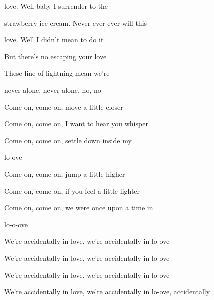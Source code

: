 \begin{song}
\bigskip

love. Well baby I surrender to the \par
{}strawberry ice cream. Never ever ever will this \par
{}love. Well I didn't mean to do it \par
But there's no escaping your love \par

\bigskip

 These line of lightning mean we're \par
{}never alone, never alone, no, no \par

\bigskip

Come on, come on, move a little closer \par
{}Come on, come on, I want to hear you whisper \par
{}Come on, come on, settle down inside my \par
{}lo-ove \par

\bigskip

Come on, come on, jump a little higher \par
{}Come on, come on, if you feel a little lighter \par
{}Come on, come on, we were once upon a time in \par
{}lo-o-ove \par

\bigskip

We're accidentally in love,  we're accidentally in lo-ove \par
We're accidentally in love,  we're accidentally in lo-ove \par
We're accidentally in love,  we're accidentally in lo-ove \par
We're accidentally in love,  we're accidentally in lo-ove, accidentally \par

\bigskip


\end{song}

